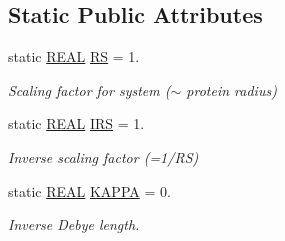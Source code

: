 \subsection*{Static Public Attributes}
\begin{DoxyCompactItemize}
\item 
static \hyperlink{util_8h_a5821460e95a0800cf9f24c38915cbbde}{R\-E\-A\-L} \hyperlink{classCMCoeff_a512caa3ff1994cbde85011489b8f34ce}{R\-S} = 1.
\begin{DoxyCompactList}\small\item\em Scaling factor for system ($\sim$ protein radius) \end{DoxyCompactList}\item 
static \hyperlink{util_8h_a5821460e95a0800cf9f24c38915cbbde}{R\-E\-A\-L} \hyperlink{classCMCoeff_a7e893ff6deb29f85472663fffd995f42}{I\-R\-S} = 1.
\begin{DoxyCompactList}\small\item\em Inverse scaling factor (=1/\-R\-S) \end{DoxyCompactList}\item 
static \hyperlink{util_8h_a5821460e95a0800cf9f24c38915cbbde}{R\-E\-A\-L} \hyperlink{classCMCoeff_a468f6af1ba4ddbe13561217488c87b40}{K\-A\-P\-P\-A} = 0.
\begin{DoxyCompactList}\small\item\em Inverse Debye length. \end{DoxyCompactList}\end{DoxyCompactItemize}

